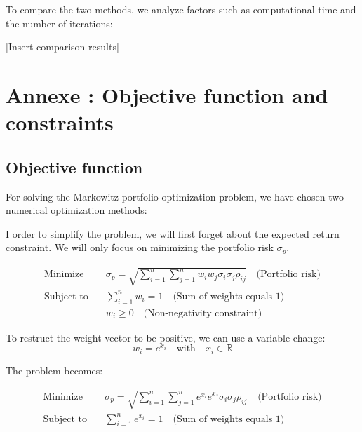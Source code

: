 \documentclass[12pt]{article}
\begin{document}
To compare the two methods, we analyze factors such as computational time and the number of iterations:

[Insert comparison results]

\section*{Annexe : Objective function and constraints}

\subsection*{Objective function}

For solving the Markowitz portfolio optimization problem, we have chosen two numerical optimization methods:


I order to simplify the problem, we will first forget about the expected return constraint. We will only focus on minimizing the portfolio risk $\sigma_p$.

\begin{equation}
    \begin{aligned}
        \text{Minimize} \quad   & \sigma_p = \sqrt{\sum_{i=1}^{n}\sum_{j=1}^{n} w_i w_j \sigma_i \sigma_j \rho_{ij}} \quad \text{(Portfolio risk)} \\
        \text{Subject to} \quad & \sum_{i=1}^{n} w_i = 1 \quad \text{(Sum of weights equals 1)}                                                        \\
                                & w_i \geq 0 \quad \text{(Non-negativity constraint)}
    \end{aligned}
\end{equation}


To restruct the weight vector to be positive, we can use a variable change:
\begin{equation}
    w_i = e^{x_i} \quad \text{with} \quad x_i \in \mathbb{R}
\end{equation}

The problem becomes:

\begin{equation}
    \begin{aligned}
        \text{Minimize} \quad   & \sigma_p = \sqrt{\sum_{i=1}^{n}\sum_{j=1}^{n} e^{x_i} e^{x_j} \sigma_i \sigma_j \rho_{ij}} \quad \text{(Portfolio risk)} \\
        \text{Subject to} \quad & \sum_{i=1}^{n} e^{x_i} = 1 \quad \text{(Sum of weights equals 1)}    
    \end{aligned}
\end{equation}
\end{document}

